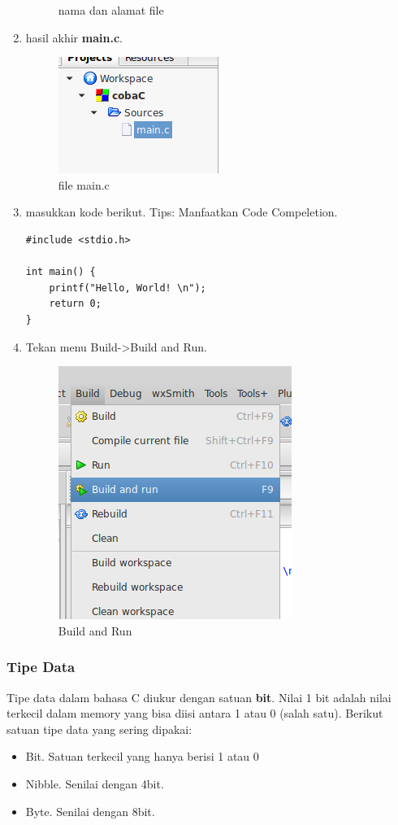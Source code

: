 \documentclass[12pt,]{article}
\begin{document}
\begin{enumerate}
\begin{figure}[H]
			\caption{nama dan alamat file}
		\end{figure}
		\item hasil akhir \textbf{main.c}.
		\begin{figure}[H]
			\centering
			\includegraphics[width=0.4\linewidth]{images/c_cb_8}
			\caption{file main.c}
		\end{figure}
	
		\item masukkan kode berikut.
		Tips: Manfaatkan Code Compeletion.
		\begin{verbatim}
#include <stdio.h>

int main() {
	printf("Hello, World! \n");
	return 0;
}
		\end{verbatim}
		\item Tekan menu Build->Build and Run.
		\begin{figure}[H]
			\centering
			\includegraphics[width=0.4\linewidth]{images/c_cb_9}
			\caption{Build and Run}
		\end{figure}
			
	\end{enumerate}

	\subsubsection{Tipe Data}
	Tipe data dalam bahasa C diukur dengan satuan \textbf{bit}.
	Nilai 1 bit adalah nilai terkecil dalam memory yang bisa diisi antara 1 atau 0 (salah satu).
	Berikut satuan tipe data yang sering dipakai:
	\begin{itemize}
		\item Bit. Satuan terkecil yang hanya berisi 1 atau 0
		\item Nibble. Senilai dengan 4bit.
		\item Byte. Senilai dengan 8bit.
	\end{itemize}
\end{document}

